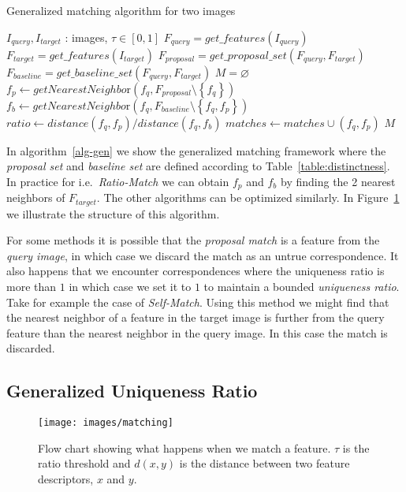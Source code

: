 \documentclass[journal]{IEEEtran}
\begin{document}
\begin{algorithm}[htb]
\caption{Generalized matching algorithm for two images}
\label{alg-gen}
\begin{algorithmic}
    \Require $I_{query}, I_{target}$ : images, $\tau \in [0,1]$
    \State $F_{query} = get\_features(I_{query})$
    \State $F_{target} = get\_features(I_{target})$
\State $F_{proposal} = get\_proposal\_set(F_{query}, F_{target})$
\State $F_{baseline} = get\_baseline\_set(F_{query}, F_{target})$
\State $M = \varnothing$
    \State $f_p \gets getNearestNeighbo\text{r}(f_q, F_{proposal} \setminus 
    \left\{f_q\right\})$
    \State $f_b \gets getNearestNeighbo\text{r}(f_q, F_{baseline} \setminus 
    \left\{f_q, f_p\right\})$
    \State $ratio \gets distance(f_q, f_p) / distance(f_q, f_b)$
        \State $matches \gets matches \cup \left(f_q, f_p\right)$
	\EndIf
\EndFor
\Return $M$
\end{algorithmic}
\end{algorithm}

In algorithm~\ref{alg-gen} we show the generalized matching framework 
where the \emph{proposal set} and \emph{baseline set} are defined 
according to Table~\ref{table:distinctness}.  In practice for i.e.\ 
\emph{Ratio-Match} we can obtain $f_p$ and $f_b$ by finding the 2 
nearest neighbors of $F_{target}$. The other algorithms can be optimized 
similarly. In Figure~\ref{fig:matching} we illustrate the structure of 
this algorithm.

For some methods it is possible that the \emph{proposal match} is a 
feature from the \emph{query image}, in which case we discard the match 
as an untrue correspondence.  It also happens that we encounter 
correspondences where the uniqueness ratio is more than $1$ in which 
case we set it to $1$ to maintain a bounded \emph{uniqueness ratio}.  
Take for example the case of \emph{Self-Match}. Using this method we 
might find that the nearest neighbor of a feature in the target image is 
further from the query feature than the nearest neighbor in the query 
image. In this case the match is discarded.

\subsection{Generalized Uniqueness Ratio}

\begin{figure}[t]
\centering
\texttt{[image: images/matching]}
\caption{Flow chart showing what happens when we match a feature. $\tau$ 
is the ratio threshold and $d(x,y)$ is the distance between two feature 
descriptors, $x$ and $y$.}
\label{fig:matching}
\end{figure}
%
\end{document}
